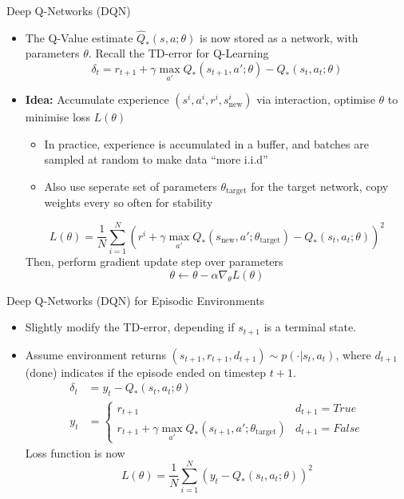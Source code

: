 \documentclass[10pt,a4paper, handout]{beamer}
\begin{document}
\begin{frame}{Deep Q-Networks (DQN)}
	\begin{itemize}
		\item The Q-Value estimate $\hat{Q}_*(s,a;\theta)$ 
		is now stored as a network, with parameters $\theta$.
		Recall the TD-error for Q-Learning
		$$
		\delta_t = r_{t+1} + \gamma \max_{a'} Q_{*}(s_{t+1}, a'; \theta) 
		- Q_{*}(s_t, a_t;\theta)
		$$
		\pause
		\item \textbf{Idea:} Accumulate experience 
		$(s^i,a^i,r^i,s_{\text{new}}^i)$ via interaction, optimise
		$\theta$ to minimise loss $L(\theta)$
		\pause
		\begin{itemize}
			\item In practice, experience is accumulated in a buffer, and batches
			are sampled at random to make data ``more i.i.d''
			\pause
			\item Also use seperate set of parameters $\theta_{\text{target}}$ 
			for the target network, copy weights every so often for stability
		\end{itemize}
		\pause
		$$
		L(\theta) = \frac{1}{N}\sum_{i=1}^{N} 
		\left(
		r^i + \gamma \max_{a'} Q_{*}(s_\text{new}, a'; \theta_{\text{target}} ) -  Q_{*}(s_t, a_t; \theta)
		\right)^2
		$$  
		\pause
		Then, perform gradient update step over parameters
		$$
		\theta \leftarrow \theta - \alpha \nabla_\theta L(\theta)
		$$
	\end{itemize}
\end{frame}

\begin{frame}{Deep Q-Networks (DQN) for Episodic Environments}
	\begin{itemize}
		\item Slightly modify the TD-error, depending if $s_{t+1}$ 
		is a terminal state.
		\item Assume environment returns $(s_{t+1}, r_{t+1}, d_{t+1}) \sim p(\cdot | s_t, a_t)$,
		where $d_{t+1}$ (done) indicates if the episode ended on timestep $t+1$.
		\begin{align*}
			\delta_t &= y_t - Q_{*}(s_t, a_t;\theta) \\
		y_t &= \begin{cases}
			r_{t+1} & d_{t+1} = True \\
			r_{t+1} + \gamma \max_{a'} Q_{*}(s_{t+1}, a'; \theta_{\text{target}}) & d_{t+1} = False 
		\end{cases} 
		\end{align*}
		\pause
		Loss function is now
		$$
		L(\theta) = \frac{1}{N} \sum_{i=1}^N \left(y_t - Q_*(s_t,a_t; \theta )\right)^2
		$$
		\end{itemize}
\end{frame}
\end{document}
